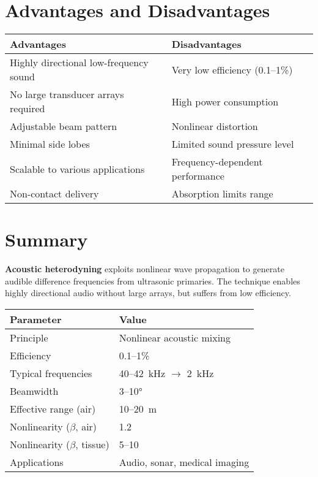 \section{Advantages and Disadvantages}

\begin{center}
\begin{tabular}{@{}p{7cm}p{7cm}@{}}
\toprule
\textbf{Advantages} & \textbf{Disadvantages} \\
\midrule
Highly directional low-frequency sound & Very low efficiency (0.1--1\%) \\
No large transducer arrays required & High power consumption \\
Adjustable beam pattern & Nonlinear distortion \\
Minimal side lobes & Limited sound pressure level \\
Scalable to various applications & Frequency-dependent performance \\
Non-contact delivery & Absorption limits range \\
\bottomrule
\end{tabular}
\end{center}

\section{Summary}

\textbf{Acoustic heterodyning} exploits nonlinear wave propagation to generate audible difference frequencies from ultrasonic primaries. The technique enables highly directional audio without large arrays, but suffers from low efficiency.

\begin{center}
\begin{tabular}{@{}ll@{}}
\toprule
\textbf{Parameter} & \textbf{Value} \\
\midrule
Principle & Nonlinear acoustic mixing \\
Efficiency & 0.1--1\% \\
Typical frequencies & 40--42~kHz $\rightarrow$ 2~kHz \\
Beamwidth & 3--10° \\
Effective range (air) & 10--20~m \\
Nonlinearity ($\beta$, air) & 1.2 \\
Nonlinearity ($\beta$, tissue) & 5--10 \\
Applications & Audio, sonar, medical imaging \\
\bottomrule
\end{tabular}
\end{center}

